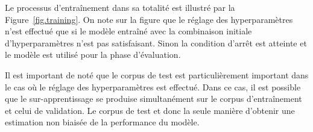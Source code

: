 Le processus d'entraînement dans sa totalité est illustré par la Figure~\ref{fig.training}.
On note sur la figure que le réglage des hyperparamètres n'est effectué 
que si le modèle entraîné avec la combinaison initiale d'hyperparamètres n'est pas satisfaisant.
Sinon la condition d'arrêt est atteinte et le modèle est utilisé pour la phase d'évaluation.

Il est important de noté que le corpus de test est particulièrement important 
dans le cas où le réglage des hyperparamètres est effectué.
Dans ce cas, il est possible que le sur-apprentissage se produise simultanément 
sur le corpus d'entraînement et celui de validation.
Le corpus de test et donc la seule manière d'obtenir une estimation non biaisée de la performance du modèle.